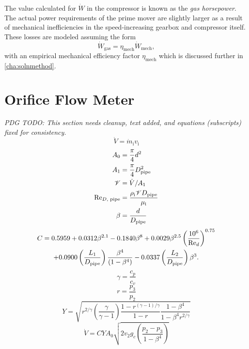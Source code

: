 The value calculated for $\dot{W}$ in the compressor is known
as the \emph{gas horsepower}. The actual power requirements of the
prime mover are slightly larger as a result of mechanical inefficiencies
in the speed-increasing gearbox and compressor itself.
These losses are modeled assuming the form
\begin{equation}
  \dot{W}_{\text{gas}} = \eta_{\text{mech}}\dot{W}_{\text{mech}},
\end{equation}
with an empirical mechanical efficiency factor $\eta_{\text{mech}}$
which is discussed further in \cref{cha:solnmethod}.

\section{Orifice Flow Meter} \label{sec:Orifice}
\emph{PDG TODO: This section needs cleanup, text added, and equations (subscripts) fixed for consistency.}
\begin{equation}
  \dot{V} = \dot{m}_{\text{i}}v_{\text{i}}
\end{equation}
\begin{align}
  A_0 &= \frac{\pi}{4} d^2 \\
  A_1 &= \frac{\pi}{4} D_{\text{pipe}}^2 \\
  \mathscr{V} &= \dot{V}/A_1 \\
  \mathrm{Re}_{D,\text{ pipe}} &= \frac{\rho_{\text{i}} \mathscr{V} D_{\text{pipe}}}{\mu_{\text{i}}} \\
  \beta &= \frac{d}{D_{\text{pipe}}}
\end{align}
\begin{multline}
  C = 0.5959 + 0.0312\beta^{2.1} - 0.1840\beta^8 + 0.0029\beta^{2.5}\left(\frac{10^6}{\mathrm{Re}_d}\right)^{0.75} \\ 
      + 0.0900\left(\frac{L_1}{D_{\text{pipe}}}\right)\frac{\beta^4}{\left(1-\beta^4\right)} 
      - 0.0337\left(\frac{L_2}{D_{\text{pipe}}}\right)\beta^3.
\end{multline}
\begin{equation}
  \gamma = \frac{c_p}{c_v}
\end{equation}
\begin{equation}
  r = \frac{p_3}{p_2}
\end{equation}
\begin{equation}
  Y = \sqrt{r^{2/\gamma}\left(\frac{\gamma}{\gamma-1}\right)\frac{1-r^{(\gamma-1)/\gamma}}{1-r}\frac{1-\beta^4}{1-\beta^4r^{2/\gamma}}}
\end{equation}
\begin{equation}
  \dot{V} = C Y A_0 \sqrt{2v_2g_c\left(\frac{p_2-p_3}{1-\beta^4}\right)}
\end{equation}

